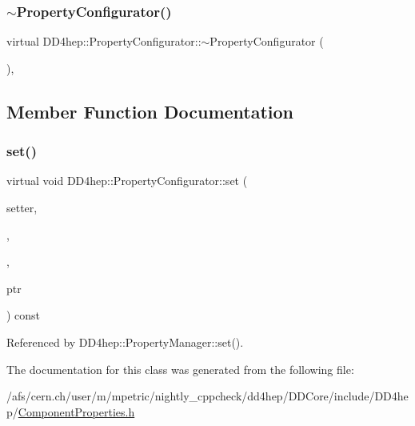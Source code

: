 \subsubsection{\texorpdfstring{$\sim$\+Property\+Configurator()}{~PropertyConfigurator()}}
{\footnotesize\ttfamily virtual D\+D4hep\+::\+Property\+Configurator\+::$\sim$\+Property\+Configurator (\begin{DoxyParamCaption}{ }\end{DoxyParamCaption})\hspace{0.3cm}{\ttfamily [protected]}, {\ttfamily [virtual]}}



\subsection{Member Function Documentation}
\hypertarget{class_d_d4hep_1_1_property_configurator_a863dbbfed205e1a74c7e81dd1375843f}{}\label{class_d_d4hep_1_1_property_configurator_a863dbbfed205e1a74c7e81dd1375843f} 
\subsubsection{\texorpdfstring{set()}{set()}}
{\footnotesize\ttfamily virtual void D\+D4hep\+::\+Property\+Configurator\+::set (\begin{DoxyParamCaption}\item[{const \hyperlink{class_d_d4hep_1_1_property_grammar}{Property\+Grammar} \&}]{setter,  }\item[{const std\+::string \&}]{,  }\item[{const std\+::string \&}]{,  }\item[{void $\ast$}]{ptr }\end{DoxyParamCaption}) const\hspace{0.3cm}{\ttfamily [pure virtual]}}



Referenced by D\+D4hep\+::\+Property\+Manager\+::set().



The documentation for this class was generated from the following file\+:\begin{DoxyCompactItemize}
\item 
/afs/cern.\+ch/user/m/mpetric/nightly\+\_\+cppcheck/dd4hep/\+D\+D\+Core/include/\+D\+D4hep/\hyperlink{_component_properties_8h}{Component\+Properties.\+h}\end{DoxyCompactItemize}
